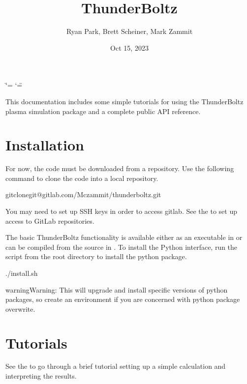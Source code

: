 \documentclass[letterpaper,10pt,english,openany,oneside]{sphinxmanual}
\title{ThunderBoltz}
\date{Oct 15, 2023}
\author{Ryan Park, Brett Scheiner, Mark Zammit}
\affil{Los Alamos National Laboratory, Los Alamos, NM, 87545}
\begin{document}
\ifdefined\shorthandoff
  \ifnum\catcode`\=\string=\active\shorthandoff{=}\fi
  \ifnum\catcode`\"=\active{}\fi
\fi

\pagestyle{empty}
\sphinxmaketitle
\pagestyle{plain}
\sphinxtableofcontents
\pagestyle{normal}
\label{\detokenize{index::doc}}


\sphinxAtStartPar
This documentation includes some simple tutorials for using
the ThunderBoltz plasma simulation package and a complete
public API reference.


\chapter{Installation}
\label{\detokenize{index:installation}}
\sphinxAtStartPar
For now, the code must be downloaded from a repository.
Use the following command to clone the code into a local repository.

\begin{sphinxVerbatim}[commandchars=\\\{\}]
gitclonegit@gitlab.com/Mczammit/thunderboltz.git
\end{sphinxVerbatim}

\sphinxAtStartPar
You may need to set up SSH keys in order to access gitlab. See the
 to
set up access to GitLab repositories.

\sphinxAtStartPar
The basic ThunderBoltz functionality is available either
as an executable in  or can be compiled from the
source in . To install the Python interface, run the
 script from the root directory to install the python package.

\begin{sphinxVerbatim}[commandchars=\\\{\}]
./install.sh
\end{sphinxVerbatim}

\begin{sphinxadmonition}{warning}{Warning:}
\sphinxAtStartPar
This will upgrade  and install specific versions of python packages,
so create an environment if you are concerned with python package overwrite.
\end{sphinxadmonition}


\chapter{Tutorials}
\label{\detokenize{index:tutorials}}
\sphinxAtStartPar
See the {\hyperref[\detokenize{quickstart::doc}]{}} to go through a brief tutorial
setting up a simple calculation and interpreting the results.
\end{document}
